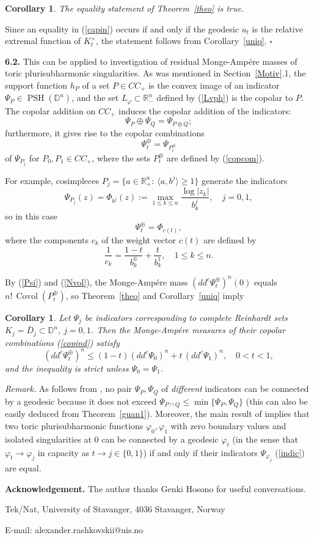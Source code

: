 \documentclass[12pt]{article}
\newcommand{\beq}{\begin{equation}}
\newcommand{\eeq}{\end{equation}}
\numberwithin{equation}{section}
\newtheorem{corollary}[theorem]{Corollary}
\newenvironment{proof}{\medbreak\noindent{\it Proof.}\rm}{\hfill$\square$\rm}
\newcommand{\PSH}{{\operatorname{PSH}}}
\newcommand{\Covol}{{\operatorname{Covol}}}
\newcommand{\D}{{\mathbb D}}
\newcommand{\Rnm}{{\mathbb R}_-^n}
\newcommand{\Rnp}{{\mathbb R}_+^n}
\newcommand{\vph}{\varphi}
\begin{document}
\begin{corollary}\label{uniq1} The equality statement of Theorem~\ref{theo} is true.
\end{corollary}

\begin{proof} Since an equality in (\ref{capin}) occurs if and only if the geodesic $u_t$ is the relative extremal function of $K_t^\times$, the statement follows from Corollary~\ref{uniq}.
\end{proof}

\bigskip
\noindent
{\bf 6.2.} This can be applied to investigation of residual Monge-Amp\'ere masses of toric plurisubharmonic singularities.
As was mentioned in Section~\ref{Motiv}.1, the support function $h_P$ of a set $P\in CC_+$ is the convex image of an indicator $\Psi_P\in\PSH(\D^n)$, and the set $L_\vph\subset\Rnm$ defined by (\ref{Lvph}) is the copolar to $P$. The copolar addition on $CC_+$ induces the copolar addition of the indicators:
$$ \Psi_P\oplus\Psi_Q= \Psi_{P\oplus Q};$$
furthermore, it gives rise to the copolar combinations
\beq\label{copind}\Psi_t^\oplus= \Psi_{P_t^\oplus}\eeq
of $\Psi_{P_j}$ for $P_0,P_1\in CC_+$, where the sets
$ P_t^\oplus$ are defined by (\ref{copcom}).

For example, cosimpleces $P_j=\{a\in\Rnp:\: \langle a,b^j\rangle\ge 1\}$ generate the indicators
$$\Psi_{P_j}(z)=\Phi_{b^j}(z):=\max_{1\le k\le n}\frac{\log|z_k|}{b_k^j},\quad j=0,1,$$
so in this case
$$\Psi_t^\oplus=\Phi_{c(t)} ,$$
where the components $c_k$ of the weight vector $c(t)$ are defined by
$$\frac1{c_k}=\frac{1-t}{b_k^0}+\frac{t}{b_k^1},\quad 1\le k\le n.$$

By (\ref{Psi}) and (\ref{Nvol}),
the Monge-Amp\'ere mass $(dd^c\Psi_t^\oplus)^n(0)$ equals $n!\,\Covol(P_t^\oplus)$, so Theorem~\ref{theo} and Corollary~\ref{uniq} imply

\begin{corollary} Let $\Psi_j$ be indicators corresponding to complete Reinhardt sets $K_j={\overline D_j}\subset\D^n$, $j=0,1$. Then the Monge-Amp\'ere measures of their copolar combinations (\ref{copind}) satisfy
$$ (dd^c\Psi_t^\oplus)^n\le (1-t)(dd^c\Psi_0)^n + t\,(dd^c\Psi_1)^n,\quad 0<t<1,$$
and the inequality is strict unless $\Psi_0=\Psi_1$.
\end{corollary}

{\it Remark.} As follows from \cite[Thm. 6.2]{R16}, no pair $\Psi_P,\Psi_Q$ of {\sl different} indicators can be connected by a geodesic because it does not exceed $\Psi_{P\cap Q}\le \min\{\Psi_P,\Psi_Q\}$ (this can also be easily deduced from Theorem~\ref{guan1}). Moreover, the main result of \cite{Ho} implies that two toric plurisubharmonic functions $\vph_0,\vph_1$ with zero boundary values and isolated singularities at $0$ can be connected by a geodesic $\vph_t$ (in the sense that $\vph_t\to \vph_j$ in capacity as $t\to j\in\{0,1\}$) if and only if their indicators $\Psi_{\vph_j}$ (\ref{indic}) are equal.

\bigskip
{\small {\bf Acknowledgement.}
The author thanks Genki Hosono for useful conversations.}





\vskip1cm

Tek/Nat, University of Stavanger, 4036 Stavanger, Norway

\vskip0.1cm

{\sc E-mail}: alexander.rashkovskii@uis.no
\end{document}
